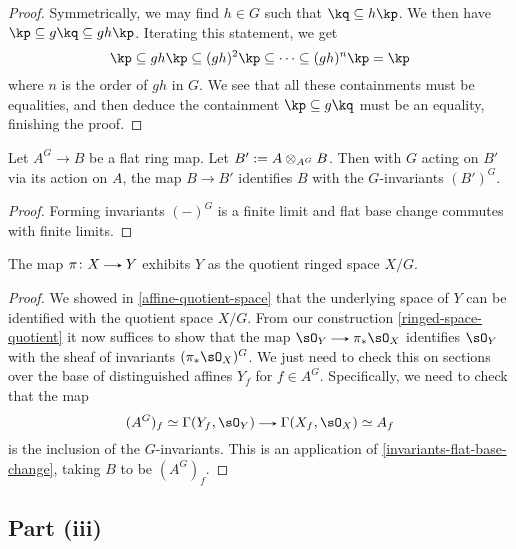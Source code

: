 \begin{nothing}
\begin{sublemma}
\begin{proof}
      Symmetrically, we may find $h \in G$ such that $\kq \subseteq h\kp$. We then have $\kp \subseteq g\kq \subseteq  gh\kp$. Iterating this statement, we get
      \[
        \kp \subseteq gh\kp \subseteq (gh)^2\kp \subseteq \cdots \subseteq (gh)^n \kp = \kp
      \]
      where $n$ is the order of $gh$ in $G$. We see that all these containments must be equalities, and then deduce the containment $\kp \subseteq g\kq$ must be an equality, finishing the proof.
    \end{proof}
  \end{sublemma}

  \begin{sublemma}
    \label{invariants-flat-base-change}
    Let $A^G \to B$ be a flat ring map. Let $B' \mathrel{:=} A \otimes_{A^G} B$. Then with $G$ acting on $B'$ via its action on $A$, the map $B \to B'$ identifies $B$ with the $G$-invariants $(B')^G$.

    \begin{proof}
      Forming invariants $(-)^G$ is a finite limit and flat base change commutes with finite limits.
    \end{proof}
  \end{sublemma}

  \begin{subproposition}
    \label{affine-quotient-ringed-space}
    The map $\pi \c X \to Y$ exhibits $Y$ as the quotient ringed space $X/G$.

    \begin{proof}
      We showed in \cref{affine-quotient-space} that the underlying space of $Y$ can be identified with the quotient space $X/G$. From our construction \cref{ringed-space-quotient} it now suffices to show that the map $\sO_Y \to \pi_*\sO_X$ identifies $\sO_Y$ with the sheaf of invariants $(\pi_*\sO_X)^G$. We just need to check this on sections over the base of distinguished affines $Y_f$ for $f \in A^G$. Specifically, we need to check that
      the map
      \[
        (A^G)_f \iso \Gamma(Y_f,\sO_Y) \to \Gamma(X_f,\sO_X) \iso A_f
      \]
      is the inclusion of the $G$-invariants. This is an application of \cref{invariants-flat-base-change}, taking $B$ to be $(A^G)_f$.
    \end{proof}
  \end{subproposition}
\end{nothing}


\subsection*{Part (iii)}

